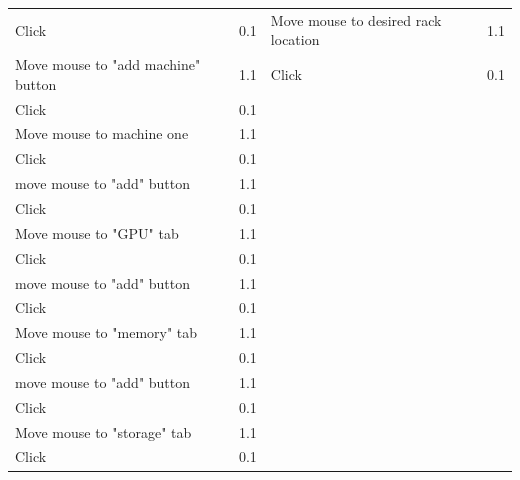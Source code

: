\documentclass[11pt]{article}
\begin{document}
\begin{table}[]
{\begin{tabular}{lrlr}
					Click                                    & 0.1       & Move mouse to desired rack location             & 1.1 \\
					Move mouse to "add machine" button       & 1.1       & Click                                           & 0.1 \\
					Click                                    & 0.1       &                                                 &     \\
					Move mouse to machine one                & 1.1       &                                                 &     \\
					Click                                    & 0.1       &                                                 &     \\
					move mouse to "add" button               & 1.1       &                                                 &     \\
					Click                                    & 0.1       &                                                 &     \\
					Move mouse to "GPU" tab                  & 1.1       &                                                 &     \\
					Click                                    & 0.1       &                                                 &     \\
					move mouse to "add" button               & 1.1       &                                                 &     \\
					Click                                    & 0.1       &                                                 &     \\
					Move mouse to "memory" tab               & 1.1       &                                                 &     \\
					Click                                    & 0.1       &                                                 &     \\
					move mouse to "add" button               & 1.1       &                                                 &     \\
					Click                                    & 0.1       &                                                 &     \\
					Move mouse to "storage" tab              & 1.1       &                                                 &     \\
					Click                                    & 0.1       &                                                 &     \\

\end{tabular}}
\end{table}
\end{document}

